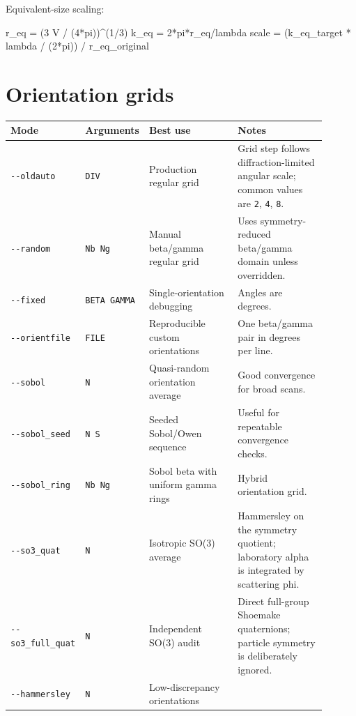 \documentclass[
  10pt,
  a4paper,
]{article}
\newenvironment{Shaded}{}{}
\newcommand{\NormalTok}[1]{#1}
\begin{document}
Equivalent-size scaling:

\begin{Shaded}
\begin{Highlighting}[]
\NormalTok{r\_eq = (3 V / (4*pi))\^{}(1/3)}
\NormalTok{k\_eq = 2*pi*r\_eq/lambda}
\NormalTok{scale = (k\_eq\_target * lambda / (2*pi)) / r\_eq\_original}
\end{Highlighting}
\end{Shaded}

\section{Orientation grids}\label{orientation-grids}

\begin{longtable}[]{@{}L{0.20\linewidth}L{0.14\linewidth}L{0.28\linewidth}L{0.28\linewidth}@{}}
\toprule\noalign{}
Mode & Arguments & Best use & Notes \\
\midrule\noalign{}
\endhead
\bottomrule\noalign{}
\endlastfoot
\texttt{-\/-oldauto} & \texttt{DIV} & Production regular grid & Grid
step follows diffraction-limited angular scale; common values are
\texttt{2}, \texttt{4}, \texttt{8}. \\
\texttt{-\/-random} & \texttt{Nb\ Ng} & Manual beta/gamma regular grid &
Uses symmetry-reduced beta/gamma domain unless overridden. \\
\texttt{-\/-fixed} & \texttt{BETA\ GAMMA} & Single-orientation debugging
& Angles are degrees. \\
\texttt{-\/-orientfile} & \texttt{FILE} & Reproducible custom
orientations & One beta/gamma pair in degrees per line. \\
\texttt{-\/-sobol} & \texttt{N} & Quasi-random orientation average &
Good convergence for broad scans. \\
\texttt{-\/-sobol\_seed} & \texttt{N\ S} & Seeded Sobol/Owen sequence &
Useful for repeatable convergence checks. \\
\texttt{-\/-sobol\_ring} & \texttt{Nb\ Ng} & Sobol beta with uniform
gamma rings & Hybrid orientation grid. \\
\texttt{-\/-so3\_quat} & \texttt{N} & Isotropic SO(3) average &
Hammersley on the symmetry quotient; laboratory alpha is integrated by
scattering phi. \\
\texttt{-\/-so3\_full\_quat} & \texttt{N} & Independent SO(3) audit &
Direct full-group Shoemake quaternions; particle symmetry is deliberately
ignored. \\
\texttt{-\/-hammersley} & \texttt{N} & Low-discrepancy orientations &

\end{longtable}
\end{document}
